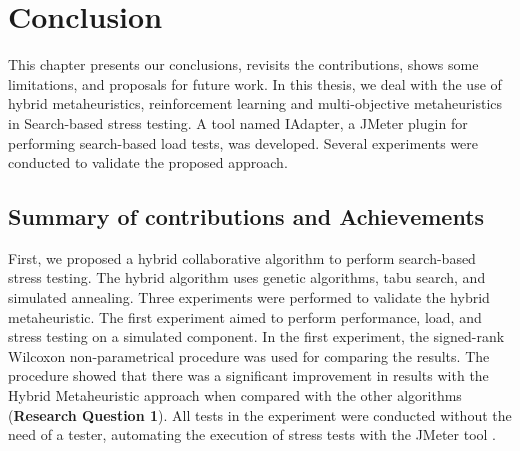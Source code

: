 \documentclass[espaco=umemeio,chapter=TITLE,twoside,openright]{abnt}
\begin{document}









%
%
%
\chapter{Conclusion}

This chapter presents our conclusions, revisits the contributions, shows some limitations, and proposals for future work. In this thesis, we deal with the use of hybrid metaheuristics, reinforcement learning and multi-objective metaheuristics in Search-based stress testing. A tool named IAdapter, a JMeter plugin for performing search-based load tests, was developed. Several experiments were conducted to validate the proposed approach.

\section{Summary of contributions and Achievements}


First, we proposed a hybrid collaborative algorithm to perform search-based stress testing.  The hybrid algorithm uses genetic algorithms, tabu search, and simulated annealing. Three experiments were performed to validate the hybrid metaheuristic. The first experiment aimed to perform performance, load, and stress testing on a simulated component.  In the first experiment, the signed-rank Wilcoxon non-parametrical procedure was used for comparing the results. The procedure showed that there was a significant improvement in  results with the Hybrid Metaheuristic approach when compared with the other algorithms (\textbf{Research Question 1}). All tests in the experiment were conducted without the need of a tester, automating the execution of stress tests with the JMeter tool \cite{Gois2016}. 
\end{document}
